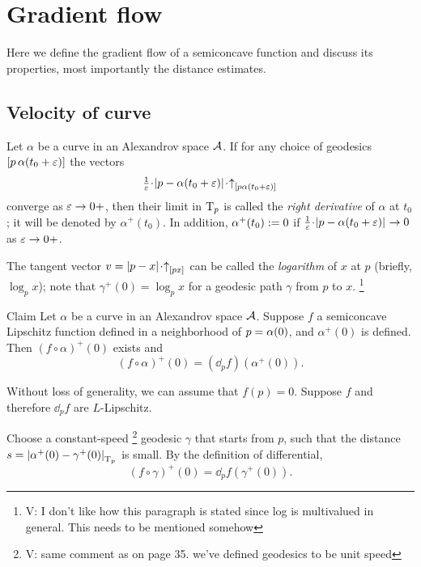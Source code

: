 
\chapter{Gradient flow}\label{chap:GF}

Here we define the gradient flow of a semiconcave function and discuss its properties,
most importantly the distance estimates.



\section{Velocity of curve}

Let $\alpha$ be a curve in an Alexandrov space $\mathcal{A}$.
If for any choice of 
geodesics $[p\,\alpha(t_0+\varepsilon)]$ the vectors 
\[\tfrac{1}{\eps}\cdot\dist{p}{\alpha(t_0+\eps)}{}\cdot\dir p{\alpha(t_0+\eps)}\]
converge as $\varepsilon\to 0+$, then their limit in $\mathrm{T}_p$ is called the \emph{right derivative} of $\alpha$ at $t_0$; it will be denoted by $\alpha^+(t_0)$.
In addition, $\alpha^+(t_0)\mathrel{:=}0$
if $\tfrac{1}{\eps}\cdot\dist{p}{\alpha(t_0+\eps)}{}\to 0$ as $\varepsilon\to 0+$.

The tangent vector $v=\dist px{}\cdot\dir px$ can be called the \emph{logarithm} of $x$ at $p$ (briefly, $\log_p x$);
note that $\gamma^+(0)=\log_px$ for a geodesic path $\gamma$ from $p$ to $x$.\label{page:log}
\footnote{\red V: I don't like how this paragraph is stated since log is multivalued in general. This needs to be mentioned somehow}

\begin{thm}{Claim}\label{clm:fa'=dfa'}
Let $\alpha$ be a curve in an Alexandrov space $\mathcal{A}$.
Suppose $f$ a semiconcave Lipschitz function
defined in a neighborhood of $p=\alpha(0)$,
and $\alpha^+(0)$ is defined.
Then $(f\circ\alpha)^+(0)$ exists and 
\[(f\circ\alpha)^+(0)
=
(\dd_pf)(\alpha^+(0)).\]

\end{thm}

Without loss of generality, we can assume that $f(p)=0$.
Suppose $f$ and therefore $\dd_pf$ are $L$-Lipschitz.

Choose a constant-speed \footnote{\red V: same comment as on page 35. we've defined geodesics to be unit speed } geodesic $\gamma$ that starts from $p$,
such that the distance
$s=|{\alpha^+(0)}-{\gamma^+(0)}|_{\mathrm{T}_p}^{{}}$
is small.
By the definition of differential,
\[(f\circ\gamma)^+(0)=\dd_pf(\gamma^+(0)).\]

